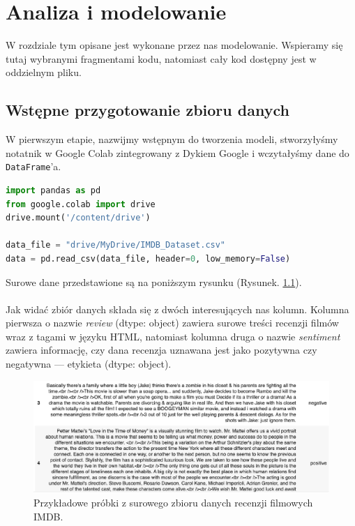 \chapter{Analiza i modelowanie}
W rozdziale tym opisane jest wykonane przez nas modelowanie. Wspieramy się tutaj wybranymi fragmentami kodu, natomiast cały kod dostępny jest w oddzielnym pliku.

\section{Wstępne przygotowanie zbioru danych} 
W pierwszym etapie, nazwijmy wstępnym do tworzenia modeli, stworzyłyśmy notatnik w Google Colab zintegrowany z Dykiem Google i wczytałyśmy dane do \verb|DataFrame|'a.

\begin{lstlisting}[language=Python,frame=single, breaklines=true,caption=Wczytywanie surowych danych z Dysku Google do pandas.DataFrame'a.,label=code:readData]
import pandas as pd
from google.colab import drive
drive.mount('/content/drive')

data_file = "drive/MyDrive/IMDB_Dataset.csv"
data = pd.read_csv(data_file, header=0, low_memory=False)
\end{lstlisting}

\noindent Surowe dane przedstawione są na poniższym rysunku (Rysunek. \ref{fig:rawDataset}). \\ \\
\noindent Jak widać zbiór danych składa się z dwóch interesujących nas kolumn. Kolumna pierwsza o nazwie \textit{review} (dtype: object) zawiera surowe treści recenzji filmów wraz z tagami w języku HTML, natomiast kolumna druga o nazwie \textit{sentiment} zawiera informację, czy dana recenzja uznawana jest jako pozytywna czy negatywna --- etykieta (dtype: object). \\

\begin{figure}[H]
	\centering
	\includegraphics[width=0.95\linewidth]{images/chapter3/raw-data-example.pdf}
	\caption{Przykładowe próbki z surowego zbioru danych recenzji filmowych IMDB.}
	\label{fig:rawDataset}
\end{figure}



